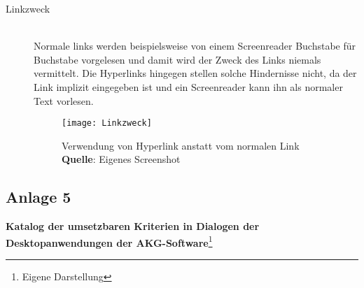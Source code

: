 \begin{description}
	\item[Linkzweck] \hfill \\
	Normale links werden beispielsweise von einem Screenreader Buchstabe für Buchstabe vorgelesen und damit wird der Zweck des Links niemals vermittelt. Die Hyperlinks hingegen stellen solche 
	Hindernisse nicht, da der Link implizit eingegeben ist und ein Screenreader kann ihn als normaler Text vorlesen.
	
	\begin{figure}[H]
		\centering
		\texttt{[image: Linkzweck]}
		\caption[Verwendung von Hyperlink anstatt vom normalen Link]{Verwendung von Hyperlink anstatt vom normalen Link\\\textbf{Quelle}: Eigenes Screenshot}
		\label{fig: Linkzweck}
	\end{figure}
\end{description}

\vspace{2em}

\subsection*{Anlage 5}
\label{subsec: Anlage5}

\textbf{Katalog der umsetzbaren Kriterien in Dialogen der Desktopanwendungen der AKG-Software}\footnote{Eigene Darstellung}


